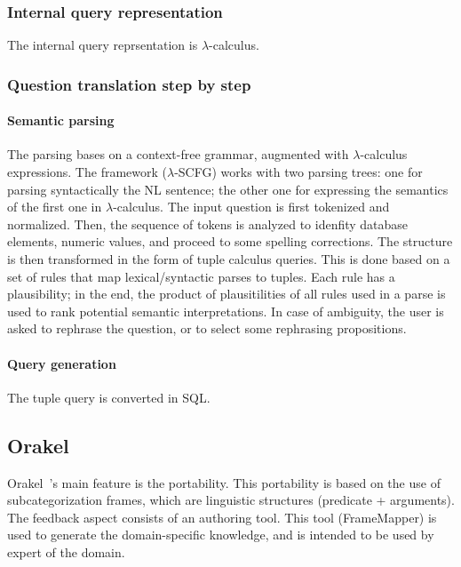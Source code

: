 \documentclass[10pt,journal,letterpaper,compsoc]{IEEEtran}
\begin{document}
\subsubsection{Internal query representation}
The internal query reprsentation is $\lambda$-calculus.

\subsubsection{Question translation step by step}
\paragraph{Semantic parsing}
The parsing bases on a context-free grammar, augmented with $\lambda$-calculus
expressions.
The framework ($\lambda$-SCFG) works with two parsing trees: one for parsing
syntactically the NL sentence; the other one for expressing the semantics of the
first one in $\lambda$-calculus.
The input question is first tokenized and normalized. 
Then, the sequence of tokens is analyzed to idenfity database elements, numeric
values, and proceed to some spelling corrections. 
The structure is then transformed in the form of tuple calculus queries. 
This is done based on a set of rules that map lexical/syntactic parses to
tuples. Each rule has a plausibility; in the end, the product of plausitilities
of all rules used in a parse is used to rank potential semantic interpretations. 
In case of ambiguity, the user is asked to rephrase the question, or to select
some rephrasing propositions. 
\paragraph{Query generation}
The tuple query is converted in SQL. 















\subsection{{\sc Orakel}~\cite{Cimiano:2007:PNL:1216295.1216330}}
{\sc Orakel}~\cite{Cimiano:2007:PNL:1216295.1216330}'s main feature is the
portability. This portability is based on the use of subcategorization frames,
which are linguistic structures (predicate + arguments).
The feedback aspect consists of an authoring tool. This tool (FrameMapper) is
used to generate the domain-specific knowledge, and is intended to be used by
expert of the domain. 
\end{document}
